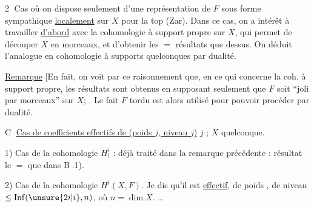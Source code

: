 \textcircled{2} Cas où on dispose seulement d'une représentation de $F$ sous forme sympathique \uline{localement} sur $X$ pour la top (Zar). Dans ce cas,
on a intérêt à travailler \uline{d'abord} avec la cohomologie à support propre sur $X$, qui permet de découper $X$ en morceaux, et d'obtenir les $=$ résultats que dessus. On déduit l'analogue en cohomologie à supports quelconques par dualité.


\uline{Remarque} [En fait, on voit par ce raisonnement que, en ce qui concerne la coh. à support propre, les résultats sont obtenus en supposant seulement que $F$ soit ``joli par morceaux'' sur $X$; . Le fait $F$  tordu  est alors utilisé  pour pouvoir procéder par dualité.

\textcircled{C} \uline{Cas de coefficients effectifs de (poids $j$, niveau $j$)} $j$ \uline{};
$X$ quelconque.

1) Cas de la cohomologie $H^i_!$ : déjà traité dans la remarque précédente : résultat le $=$ que dans \textcircled{B}.1).

2) Cas de la cohomologie $H^i(X,F)$. Je dis qu'il est \uline{effectif}, de poids  , de niveau $\le\operatorname{Inf}(\unsure{2i|i},n)$, où $n=\dim X$.  \ldots

